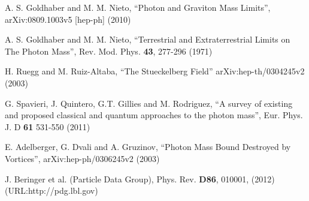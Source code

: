 \documentclass[a4paper, twocolumn, titlepage]{article}
\begin{document}
\begin{thebibliography}{9}
	A. S. Goldhaber and M. M. Nieto,
	"`Photon and Graviton Mass Limits"',
	arXiv:0809.1003v5 [hep-ph]
	(2010)

	A. S. Goldhaber and M. M. Nieto,
	"`Terrestrial and Extraterrestrial Limits on The Photon Mass"',
	Rev. Mod. Phys. {\bf 43}, 277-296
	(1971)

	H. Ruegg and M. Ruiz-Altaba,
	"`The Stueckelberg Field"'
	arXiv:hep-th/0304245v2
	(2003)

	G. Spavieri, J. Quintero, G.T. Gillies and M. Rodriguez,
	"`A survey of existing and proposed classical and quantum approaches to the photon mass"',
	Eur. Phys. J. D {\bf 61} 531-550
	(2011)

	E. Adelberger, G. Dvali and A. Gruzinov,
	"`Photon Mass Bound Destroyed by Vortices"',
	arXiv:hep-ph/0306245v2
	(2003)

	J. Beringer et al. (Particle Data Group),
	Phys. Rev. {\bf D86}, 010001,
	(2012)
	(URL:http://pdg.lbl.gov)
\end{thebibliography}
\end{document}
